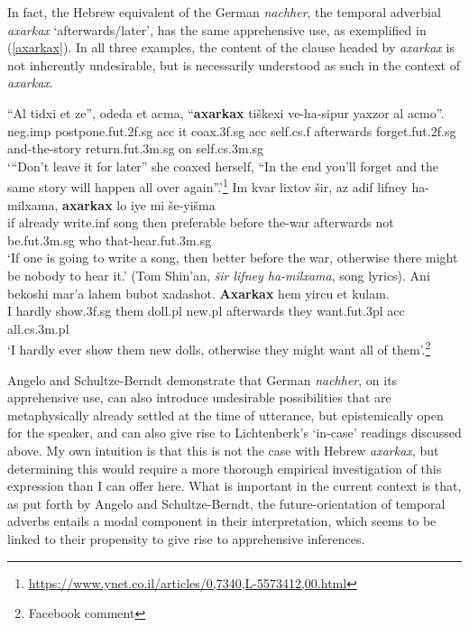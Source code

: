 \documentclass[output=paper,colorlinks,citecolor=brown]{langscibook}
\begin{document}
In fact, the Hebrew equivalent of the German \textit{nachher}, the temporal adverbial \textit{axarkax} `afterwards/later', has the same apprehensive use, as exemplified in (\ref{axarkax}). In all three examples, the content of the clause headed by \textit{axarkax} is not inherently undesirable, but is necessarily understood as such in the context of \textit{axarkax}.
\ea
\label{axarkax}
\begin{xlist}
\ex
\gll ``Al tidxi et ze'', odeda et acma, ``\textbf{axarkax} tiškexi ve-ha-sipur yaxzor al acmo''.\\
{\sc neg.imp} postpone.{\sc fut.2f.sg} {\sc acc} it coax.{\sc 3f.sg} {\sc acc} self.{\sc cs.f} afterwards forget.{\sc fut.2f.sg} and-the-story return.{\sc fut.3m.sg} on self.{\sc cs.3m.sg} \\
\glt `{}``Don't leave it for later'' she coaxed herself, ``In the end you'll forget and the same story will happen all over again''.'\footnote{\url{https://www.ynet.co.il/articles/0,7340,L-5573412,00.html}}
\ex 
\gll Im kvar lixtov šir, az adif lifney ha-milxama, \textbf{axarkax} lo iye mi še-yišma\\
if already write.{\sc inf} song then preferable before the-war afterwards not be.{\sc fut.3m.sg} who that-hear.{\sc fut.3m.sg}\\
\glt `If one is going to write a song, then better before the war, otherwise there might be nobody to hear it.' (Tom Shin'an, \textit{šir lifney ha-milxama}, song lyrics).
\ex
\gll Ani bekoshi mar'a lahem bubot xadashot. \textbf{Axarkax} hem yircu et kulam. \\
I hardly show.{\sc 3f.sg} them doll.{\sc pl} new.{\sc pl} afterwards they want.{\sc fut.3pl} {\sc acc} all.{\sc cs.3m.pl} \\

\glt `I hardly ever show them new dolls, otherwise they might want all of them'.\footnote{Facebook comment} 
\end{xlist}
\z

Angelo and Schultze-Berndt demonstrate that German \textit{nachher}, on its apprehensive use, can also introduce undesirable possibilities that are metaphysically already settled at the time of utterance, but epistemically open for the speaker, and can also give rise to Lichtenberk's `in-case' readings discussed above. My own intuition is that this is not the case with Hebrew \textit{axarkax}, but determining this would require a more thorough empirical investigation of this expression than I can offer here. What is important in the current context is that, as put forth by Angelo and Schultze-Berndt, the future-orientation of temporal adverbs entails a modal component in their interpretation, which seems to be linked to their propensity to give rise to apprehensive inferences.  
\end{document}
